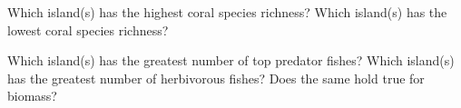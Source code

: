 \documentclass[12pt, hidelinks]{exam}
\begin{document}
\begin{questions}

\question
Which island(s) has the highest coral species richness? Which island(s) has the lowest coral species richness?


\question
Which island(s) has the greatest number of top predator fishes? Which island(s) has the greatest number of herbivorous fishes?  Does the same hold true for biomass?


\end{questions}
\end{document}
